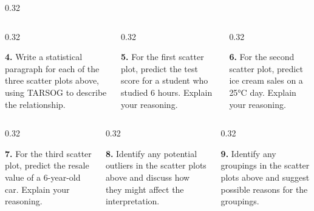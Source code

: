 \documentclass[aspectratio=169,12pt]{beamer}
\newcommand{\MMProblem}[2]{\begin{MMProblemCard}\raggedright\small\textbf{#1.} #2\par\end{MMProblemCard}}
\begin{document}
\begin{frame}[t]
\begin{columns}[T,onlytextwidth]
\begin{column}{0.32\textwidth}
{}\end{column}
\end{columns}
\vspace{0.45em}
\begin{columns}[T,onlytextwidth]
\begin{column}{0.32\textwidth}\MMProblem{4}{Write a statistical paragraph for each of the three scatter plots above, using TARSOG to describe the relationship.}\end{column}
\begin{column}{0.32\textwidth}\MMProblem{5}{For the first scatter plot, predict the test score for a student who studied 6 hours. Explain your reasoning.}\end{column}
\begin{column}{0.32\textwidth}\MMProblem{6}{For the second scatter plot, predict ice cream sales on a 25°C day. Explain your reasoning.}\end{column}
\end{columns}
\vspace{0.45em}
\begin{columns}[T,onlytextwidth]
\begin{column}{0.32\textwidth}\MMProblem{7}{For the third scatter plot, predict the resale value of a 6-year-old car. Explain your reasoning.}\end{column}
\begin{column}{0.32\textwidth}\MMProblem{8}{Identify any potential outliers in the scatter plots above and discuss how they might affect the interpretation.}\end{column}
\begin{column}{0.32\textwidth}\MMProblem{9}{Identify any groupings in the scatter plots above and suggest possible reasons for the groupings.}\end{column}
\end{columns}
\end{frame}
\end{document}
